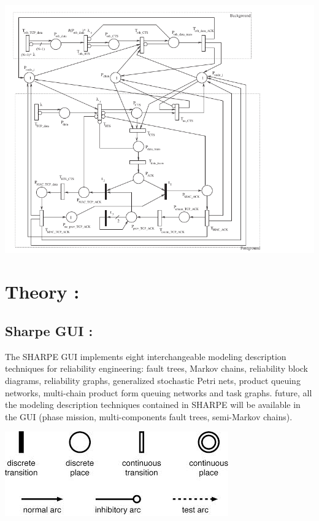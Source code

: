 \documentclass[a4paper,12pt]{article}
\begin{document}
\begin{center}
 \includegraphics{file.png}
\end{center}

 \newpage     
      
\section{Theory :}

\subsection{Sharpe GUI :}

The SHARPE GUI implements eight interchangeable modeling description
techniques for reliability engineering: fault trees, Markov chains, reliability
block diagrams, reliability graphs, generalized stochastic Petri nets,
product queuing networks, multi-chain product form queuing networks
and task graphs. future, all the modeling description techniques contained
in SHARPE will be available in the GUI (phase mission, multi-components
fault trees, semi-Markov chains).
\begin{center}
 \includegraphics{petrisym.jpeg}
\end{center}
\end{document}
